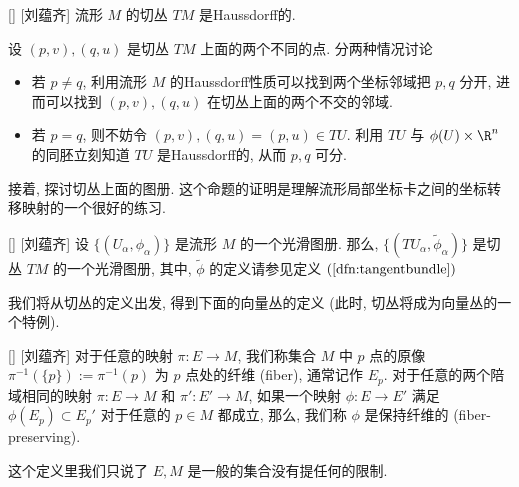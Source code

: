 \documentclass[UTF8]{ctexart}
\begin{document}
        \begin{ppt}
            []
            {}
            []
            [刘蕴齐]
            流形 \(M\) 的切丛 \(TM\) 是Haussdorff的. 
        \end{ppt}

        \begin{prf}
            设 \((p,v), (q,u)\) 是切丛 \(TM\) 上面的两个不同的点. 分两种情况讨论
            \begin{itemize}
                \item 若 \(p \neq q\), 利用流形 \(M\) 的Haussdorff性质可以找到两个坐标邻域把 \(p,q\) 分开, 进而可以找到 \((p,v), (q,u)\) 在切丛上面的两个不交的邻域. 
                \item 若 \(p = q\), 则不妨令 \((p,v), (q,u)=(p,u) \in TU\). 利用 \(TU\) 与 \(\phi(U) \times \R^n\) 的同胚立刻知道 \(TU\) 是Haussdorff的, 从而 \(p, q\) 可分. 
            \end{itemize}
        \end{prf}

        接着, 探讨切丛上面的图册. 这个命题的证明是理解流形局部坐标卡之间的坐标转移映射的一个很好的练习. 

        \begin{ppt}
            []
            {}
            []
            [刘蕴齐]
            设 \(\{(U_{\alpha}, \phi_{\alpha})\}\) 是流形 \(M\) 的一个光滑图册. 那么,  \(\{(T U_{\alpha}, \tilde{\phi}_{\alpha})\}\) 是切丛 \(TM\) 的一个光滑图册, 其中,  \(\tilde{\phi}\) 的定义请参见定义 \((\ref{dfn:tangentbundle})\) 
        \end{ppt}

        我们将从切丛的定义出发, 得到下面的向量丛的定义 (此时, 切丛将成为向量丛的一个特例). 

        \begin{dfn}
            []
            {}
            []
            [刘蕴齐]
            对于任意的映射 \(\pi: E \rightarrow M\), 我们称集合 \(M\) 中 \(p\) 点的原像 \(\pi^{-1} (\{p\}):= \pi^{-1}(p)\) 为 \(p\) 点处的纤维 (fiber), 通常记作 \(E_p\). 对于任意的两个陪域相同的映射 \(\pi: E \rightarrow M\) 和 \(\pi': E' \rightarrow M\), 如果一个映射 \(\phi: E \rightarrow E'\) 满足 \(\phi(E_p) \subset E_p '\) 对于任意的 \(p \in M\) 都成立, 那么, 我们称 \(\phi\) 是保持纤维的 (fiber-preserving). 
        \end{dfn}

        \begin{rmk}
            []
            这个定义里我们只说了 \(E, M\) 是一般的集合没有提任何的限制. 
        \end{rmk}
\end{document}
